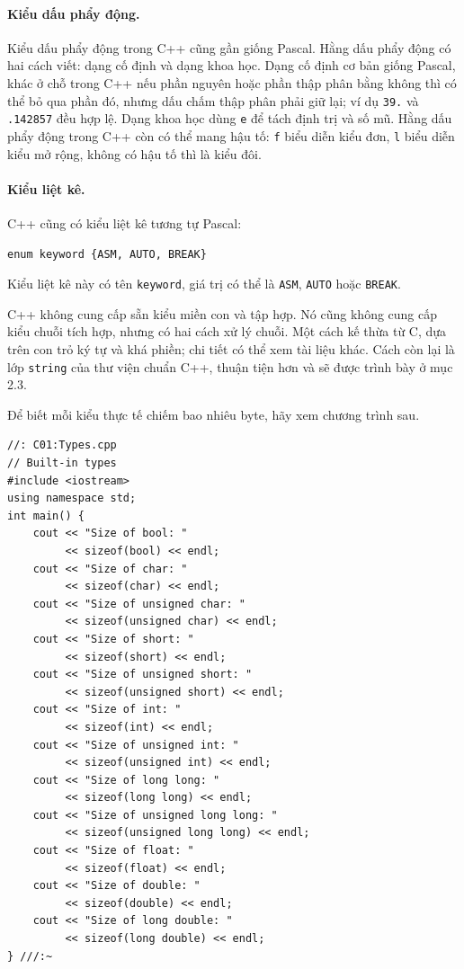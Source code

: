 \documentclass[11pt]{article}
\newcommand{\cpp}{C++}
\newcommand{\pascal}{Pascal}
\begin{document}
\paragraph{Kiểu dấu phẩy động.}
Kiểu dấu phẩy động trong \cpp{} cũng gần giống \pascal{}. Hằng dấu phẩy động
có hai cách viết: dạng cố định và dạng khoa học. Dạng cố định cơ bản giống
\pascal{}, khác ở chỗ trong \cpp{} nếu phần nguyên hoặc phần thập phân bằng
không thì có thể bỏ qua phần đó, nhưng dấu chấm thập phân phải giữ lại; ví dụ
\verb|39.| và \verb|.142857| đều hợp lệ. Dạng khoa học dùng \verb|e| để tách
định trị và số mũ. Hằng dấu phẩy động trong \cpp{} còn có thể mang hậu tố:
\verb|f| biểu diễn kiểu đơn, \verb|l| biểu diễn kiểu mở rộng, không có hậu tố
thì là kiểu đôi.

\paragraph{Kiểu liệt kê.}
\cpp{} cũng có kiểu liệt kê tương tự \pascal{}:

\begin{verbatim}
enum keyword {ASM, AUTO, BREAK}
\end{verbatim}

Kiểu liệt kê này có tên \verb|keyword|, giá trị có thể là \verb|ASM|,
\verb|AUTO| hoặc \verb|BREAK|.

\cpp{} không cung cấp sẵn kiểu miền con và tập hợp. Nó cũng không cung cấp
kiểu chuỗi tích hợp, nhưng có hai cách xử lý chuỗi. Một cách kế thừa từ C,
dựa trên con trỏ ký tự và khá phiền; chi tiết có thể xem tài liệu khác. Cách
còn lại là lớp \verb|string| của thư viện chuẩn \cpp{}, thuận tiện hơn và sẽ
được trình bày ở mục 2.3.

Để biết mỗi kiểu thực tế chiếm bao nhiêu byte, hãy xem chương trình sau.

\begin{verbatim}
//: C01:Types.cpp
// Built-in types
#include <iostream>
using namespace std;
int main() {
    cout << "Size of bool: "
         << sizeof(bool) << endl;
    cout << "Size of char: "
         << sizeof(char) << endl;
    cout << "Size of unsigned char: "
         << sizeof(unsigned char) << endl;
    cout << "Size of short: "
         << sizeof(short) << endl;
    cout << "Size of unsigned short: "
         << sizeof(unsigned short) << endl;
    cout << "Size of int: "
         << sizeof(int) << endl;
    cout << "Size of unsigned int: "
         << sizeof(unsigned int) << endl;
    cout << "Size of long long: "
         << sizeof(long long) << endl;
    cout << "Size of unsigned long long: "
         << sizeof(unsigned long long) << endl;
    cout << "Size of float: "
         << sizeof(float) << endl;
    cout << "Size of double: "
         << sizeof(double) << endl;
    cout << "Size of long double: "
         << sizeof(long double) << endl;
} ///:~
\end{verbatim}
\end{document}
